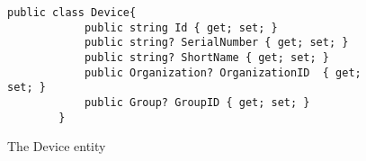 \begin{figure}[htbp]
    \begin{lstlisting}[language=CSharp]
        public class Device{
            public string Id { get; set; }
            public string? SerialNumber { get; set; }
            public string? ShortName { get; set; }
            public Organization? OrganizationID  { get; set; }
            public Group? GroupID { get; set; }
        }
    \end{lstlisting}
    \caption{The Device entity}
    \label{fig:domainLayerEntities}
\end{figure}